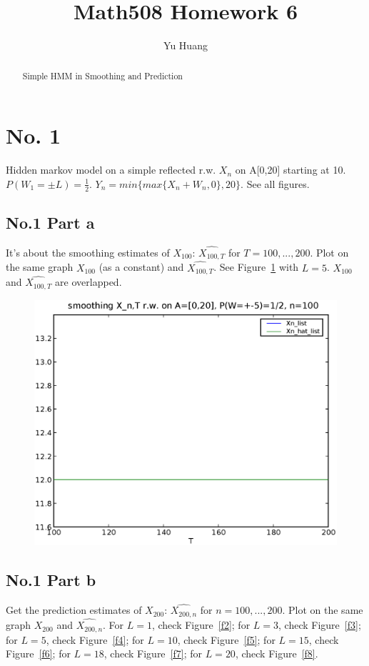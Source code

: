 \documentclass[a4paper,10pt]{article}
\title{Math508 Homework 6}
\author{Yu Huang}
\begin{document}
\maketitle

\begin{abstract}
Simple HMM in Smoothing and Prediction
\end{abstract}

\section{No. 1}
Hidden markov model on a simple reflected r.w. $X_n$ on A[0,20] starting at 10. $P(W_1 = \pm L) = \frac{1}{2}$. $Y_n = min\{max\{X_n+W_n, 0\}, 20\}$. See all figures.

\subsection{No.1 Part a}
It's about the smoothing estimates of $X_{100}$: $\hat{X_{100,T}}$ for $T = 100, ..., 200$. Plot on the same graph $X_{100}$ (as a constant) and $\hat{X_{100,T}}$. See Figure~\ref{f1} with $L=5$. $X_100$ and $\hat{X_{100,T}}$ are overlapped.

\begin{figure}[h]
\includegraphics[width=1\textwidth]{hw6_1_a_K_20_L_5_n_100.eps}
\caption{}\label{f1}
\end{figure}

\subsection{No.1 Part b}
Get the prediction estimates of $X_{200}$: $\hat{X_{200,n}}$ for $n=100,...,200$. Plot on the same graph $X_{200}$ and $\hat{X_{200,n}}$. For $L=1$, check Figure~\ref{f2}; for $L=3$, check Figure~\ref{f3}; for $L=5$, check Figure~\ref{f4}; for $L=10$, check Figure~\ref{f5}; for $L=15$, check Figure~\ref{f6}; for $L=18$, check Figure~\ref{f7}; for $L=20$, check Figure~\ref{f8}.
\end{document}
